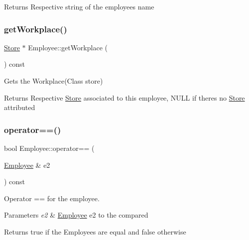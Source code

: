 \begin{DoxyReturn}{Returns}
Respective string of the employee\textquotesingle{}s name 
\end{DoxyReturn}
\mbox{\label{class_employee_a3e8bde65dfb53565695b15f38cc13988}} 
\subsubsection{\texorpdfstring{get\+Workplace()}{getWorkplace()}}
{\footnotesize\ttfamily \hyperlink{class_store}{Store} $\ast$ Employee\+::get\+Workplace (\begin{DoxyParamCaption}{ }\end{DoxyParamCaption}) const}



Gets the Workplace(\+Class store) 

\begin{DoxyReturn}{Returns}
Respective \hyperlink{class_store}{Store} associated to this employee, N\+U\+LL if there\textquotesingle{}s no \hyperlink{class_store}{Store} attributed 
\end{DoxyReturn}
\mbox{\label{class_employee_a522fb41eef0ffb9be36504ce2df9ddb2}} 
\subsubsection{\texorpdfstring{operator==()}{operator==()}}
{\footnotesize\ttfamily bool Employee\+::operator== (\begin{DoxyParamCaption}\item[{\hyperlink{class_employee}{Employee} \&}]{e2 }\end{DoxyParamCaption}) const}



Operator == for the employee. 


\begin{DoxyParams}{Parameters}
{\em e2} & \hyperlink{class_employee}{Employee} e2 to the compared\\
\hline
\end{DoxyParams}
\begin{DoxyReturn}{Returns}
true if the Employees are equal and false otherwise 
\end{DoxyReturn}
\mbox{\label{class_employee_a4c91952e1fd65e9704fd13efc220f4d3}} 
